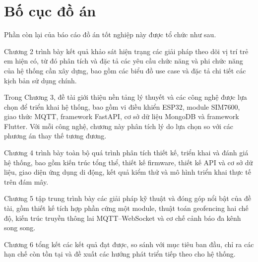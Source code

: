 \documentclass[../DoAn.tex]{subfiles}
\begin{document}
\section{Bố cục đồ án}
\label{section:1.4}

Phần còn lại của báo cáo đồ án tốt nghiệp này được tổ chức như sau.

Chương 2 trình bày kết quả khảo sát hiện trạng các giải pháp theo dõi vị trí trẻ em hiện có, từ đó phân tích và đặc tả các yêu cầu chức năng và phi chức năng của hệ thống cần xây dựng, bao gồm các biểu đồ use case và đặc tả chi tiết các kịch bản sử dụng chính.

Trong Chương 3, đề tài giới thiệu nền tảng lý thuyết và các công nghệ được lựa chọn để triển khai hệ thống, bao gồm vi điều khiển ESP32, module SIM7600, giao thức MQTT, framework FastAPI, cơ sở dữ liệu MongoDB và framework Flutter. Với mỗi công nghệ, chương này phân tích lý do lựa chọn so với các phương án thay thế tương đương.

Chương 4 trình bày toàn bộ quá trình phân tích thiết kế, triển khai và đánh giá hệ thống, bao gồm kiến trúc tổng thể, thiết kế firmware, thiết kế API và cơ sở dữ liệu, giao diện ứng dụng di động, kết quả kiểm thử và mô hình triển khai thực tế trên đám mây.

Chương 5 tập trung trình bày các giải pháp kỹ thuật và đóng góp nổi bật của đề tài, gồm thiết kế tích hợp phần cứng một module, thuật toán geofencing hai chế độ, kiến trúc truyền thông lai MQTT–WebSocket và cơ chế cảnh báo đa kênh song song.

Chương 6 tổng kết các kết quả đạt được, so sánh với mục tiêu ban đầu, chỉ ra các hạn chế còn tồn tại và đề xuất các hướng phát triển tiếp theo cho hệ thống.
\end{document}
